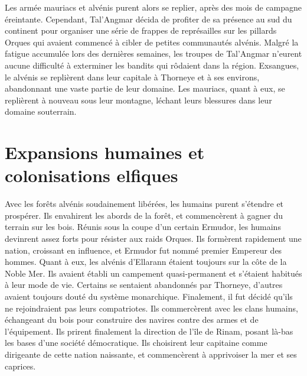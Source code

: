 \newline
Les armée mauriacs et alvénis purent alors se replier, après des mois de campagne éreintante. Cependant, Tal'Angmar décida de profiter de sa présence au sud du continent pour organiser une série de frappes de représailles sur les pillards Orques qui avaient commencé à cibler de petites communautés alvénis. Malgré la fatigue accumulée lors des dernières semaines, les troupes de Tal'Angmar n'eurent aucune difficulté à exterminer les bandits qui rôdaient dans la région. Exsangues, le alvénis se replièrent dans leur capitale à Thorneye et à ses environs, abandonnant une vaste partie de leur domaine. Les mauriacs, quant à eux, se replièrent à nouveau sous leur montagne, léchant leurs blessures dans leur domaine souterrain.
\section{Expansions humaines et colonisations elfiques}
Avec les forêts alvénis soudainement libérées, les humains purent s'étendre et prospérer. Ils envahirent les abords de la forêt, et commencèrent à gagner du terrain sur les bois. Réunis sous la coupe d'un certain Ermudor, les humains devinrent assez forts pour résister aux raids Orques. Ils formèrent rapidement une nation, croissant en influence, et Ermudor fut nommé premier Empereur des hommes.
Quant à eux, les alvénis d'Ellarann étaient toujours sur la côte de la Noble Mer. Ils avaient établi un campement quasi-permanent et s'étaient habitués à leur mode de vie. Certains se sentaient abandonnés par Thorneye, d'autres avaient toujours douté du système monarchique. Finalement, il fut décidé qu'ils ne rejoindraient pas leurs compatriotes. Ils commercèrent avec les clans humains, échangeant du bois pour construire des navires contre des armes et de l'équipement. Ils prirent finalement la direction de l'île de Rinam, posant là-bas les bases d'une société démocratique. Ils choisirent leur capitaine comme dirigeante de cette nation naissante, et commencèrent à apprivoiser la mer et ses caprices.
